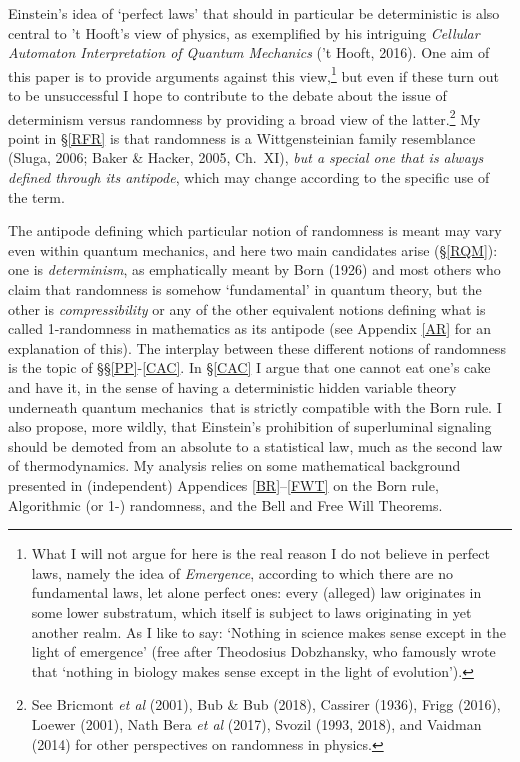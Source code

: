 \documentclass[11pt,a4paper]{article}
\numberwithin{equation}{section}
\newcommand{\qm}{quantum mechanics}
\begin{document}
Einstein's idea of `perfect laws' that should in particular be deterministic is also central to 't Hooft's view of physics, as exemplified by his intriguing \emph{Cellular Automaton Interpretation of Quantum Mechanics} ('t Hooft, 2016). One aim of this paper is to provide arguments against this view,\footnote{\label{Emfn} What I will not argue for here is the real reason I do not believe in perfect laws, namely the idea of \emph{Emergence}, according to which there are no fundamental laws, let alone perfect ones: every (alleged) law originates in some lower substratum, which itself is subject to laws originating in yet another realm. As I like to say: `Nothing in science makes sense except in the light of emergence' (free after Theodosius Dobzhansky, who famously wrote that `nothing in biology makes sense except in the light of evolution').} but even if these turn out to be unsuccessful I hope to contribute to the debate about the issue of determinism versus randomness  by providing a broad view of the latter.\footnote{See Bricmont \emph{et al} (2001),
Bub \& Bub (2018), Cassirer (1936),  Frigg (2016), Loewer (2001), Nath Bera \emph{et al} (2017),  Svozil (1993, 2018), and Vaidman (2014)
for  other perspectives on randomness in physics. }
My point in \S\ref{RFR} is that randomness is a Wittgensteinian family resemblance (Sluga, 2006; Baker \& Hacker, 2005, Ch.\ XI), \emph{but a special one  that is always defined through its antipode}, which may change according to the specific use of the term. 

The antipode defining which particular notion of randomness is meant may vary even within \qm, and here two main candidates arise (\S\ref{RQM}): one is \emph{determinism}, as emphatically meant by Born (1926) and most others who claim that randomness is somehow `fundamental' in quantum theory, but the other is \emph{compressibility} or any of the other equivalent notions defining what is called 1-randomness in mathematics as its antipode (see Appendix \ref{AR} for an explanation of this). The interplay between these different notions of randomness is the topic of \S\S\ref{PP}-\ref{CAC}.
In  \S\ref{CAC} I argue that one cannot eat one's cake and have it, in the sense of having a deterministic hidden variable theory underneath \qm\ that is strictly compatible with the Born rule. I also propose, more wildly, that Einstein's prohibition of superluminal signaling should be demoted from an absolute to a statistical law, much as the second law of thermodynamics. 
My analysis  relies on some mathematical background presented  in (independent) Appendices \ref{BR}--\ref{FWT} on the Born rule, Algorithmic (or 1-) randomness, and the Bell and Free Will Theorems.
\end{document}
